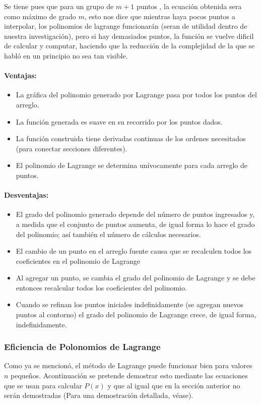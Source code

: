 \documentclass[final, 12pt letterpaper]{article}
\begin{document}
Se tiene pues que para un grupo de $m+1$ puntos , la ecuación obtenida sera como máximo de grado $m$, esto nos dice que mientras haya pocos puntos a interpolar, los polinomios de lagrange funcionarán (seran de utilidad dentro de nuestra investigación), pero si hay demasiados puntos, la función se vuelve dificil de calcular y computar, haciendo que la reducción de la complejidad de la que se habló en un principio no sea tan visible.
\paragraph{Ventajas:}
\begin{itemize}
\item La gráfica del polinomio generado por Lagrange pasa por todos los puntos del arreglo.
\item La función generada es suave en su recorrido por los puntos dados.
\item La función construida tiene derivadas continuas de los ordenes necesitados (para conectar secciones diferentes).
\item El polinomio de Lagrange se determina unívocamente para cada arreglo de puntos.
\end{itemize}
\paragraph{Desventajas:}
\begin{itemize}
\item El grado del polinomio generado depende del número de puntos ingresados y, a medida que el conjunto de puntos aumenta, de igual forma lo hace el grado del polinomio; así también el número de cálculos necesarios.
\item El cambio de un punto en el arreglo fuente causa que se recalculen todos los coeficientes en el polinomio de Lagrange
\item Al agregar un punto, se cambia el grado del polinomio de Lagrange y se debe entonces recalcular todos los coeficientes del polinomio.
\item Cuando se refinan los puntos iniciales indefinidamente (se agregan nuevos puntos al contorno) el grado del polinomio de Lagrange crece, de igual forma, indefinidamente.
\end{itemize}

\subsubsection*{Eficiencia de Polonomios de Lagrange}
Como ya se mencionó, el método de Lagrange puede funcionar bien para valores $n$ pequeños. Acontinuación se pretende demostrar esto mediante las ecuaciones que se usan para calcular $P(x)$ y que al igual que en la sección anterior no serán demostradas (Para una demostración detallada, véase\cite{AN-NUMERICO}).\smallskip
\end{document}

